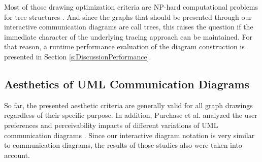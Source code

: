 Most of those drawing optimization criteria are NP-hard computational problems for tree structures \cite{battista_graph_1998}.
And since the graphs that should be presented through our interactive communication diagrams are call trees, this raises the question if the immediate character of the underlying tracing approach can be maintained.
For that reason, a runtime performance evaluation of the diagram construction is presented in Section \ref{s:DiscussionPerformance}.

\subsection{Aesthetics of UML Communication Diagrams}
\label{ss:ApproachLayoutUML}
So far, the presented aesthetic criteria are generally valid for all graph drawings regardless of their specific purpose.
In addition, Purchase et al. analyzed the user preferences and perceivability impacts of different variations of UML communication diagrams \cite{purchase_uml_2002, purchase_graph_2004}.
Since our interactive diagram notation is very similar to communication diagrams, the results of those studies also were taken into account.
